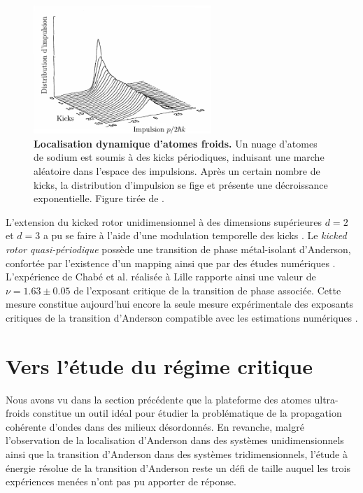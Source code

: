 \begin{figure}
\centering
\includegraphics[width=0.6\textwidth]{Fig/Localisation/kicked_rotor.pdf}
\caption{\textbf{Localisation dynamique d'atomes froids.} Un nuage d'atomes de sodium est soumis à des kicks périodiques, induisant une marche aléatoire dans l'espace des impulsions. Après un certain nombre de kicks, la distribution d'impulsion se fige et présente une décroissance exponentielle. Figure tirée de \citep{moore1995atom}. }
\label{fig:kicked_rotors}
\end{figure}

L'extension du kicked rotor unidimensionnel à des dimensions supérieures $d=2$ et $d=3$ a pu se faire à l'aide d'une modulation temporelle des kicks \citep{casati1989anderson}. Le \emph{kicked rotor quasi-périodique} possède une transition de phase métal-isolant d'Anderson, confortée par l'existence d'un mapping \citep{lemarie2009observation} ainsi que par des études numériques \citep{lemarie2009universality}. L'expérience de Chabé et al. réalisée à Lille rapporte ainsi une valeur de $\nu=1.63\pm0.05$ de l'exposant critique de la transition de phase associée. Cette mesure constitue aujourd'hui encore la seule mesure expérimentale des exposants critiques de la transition d'Anderson compatible avec les estimations numériques \citep{chabe2008experimental}\citep{lopez2012experimental}.








\section{Vers l'étude du régime critique}
Nous avons vu dans la section précédente que la plateforme des atomes ultra-froids constitue un outil idéal pour étudier la problématique de la propagation cohérente d'ondes dans des milieux désordonnés. En revanche, malgré l'observation de la localisation d'Anderson dans des systèmes unidimensionnels ainsi que la transition d'Anderson dans des systèmes tridimensionnels, l'étude à énergie résolue de la transition d'Anderson reste un défi de taille auquel les trois expériences menées n'ont pas pu apporter de réponse.

